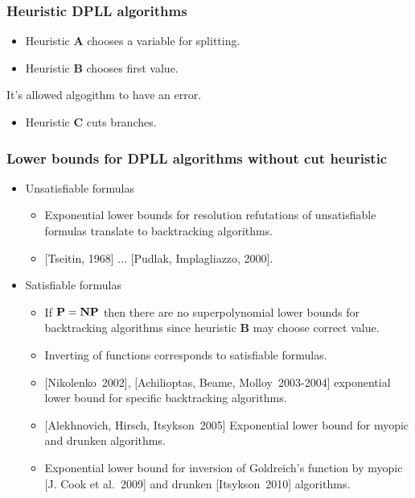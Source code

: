 \begin{frame}
	\frametitle{Heuristic DPLL algorithms}

   	
    
	\pause
    \pause
    \pause
    \pause
    \pause
    \begin{itemize}
        \item Heuristic $\mathbf{A}$ chooses a variable for splitting.
    	\pause
	    \item Heuristic $\mathbf{B}$ chooses first value.
    \end{itemize}

    \pause
    It's allowed algogithm to have an error.

    \pause
    \pause
    \begin{itemize}
	    \item Heuristic $\mathbf{C}$ cuts branches.
    \end{itemize}
\end{frame}

\begin{frame}
    \frametitle{Lower bounds for DPLL algorithms without cut heuristic}

    \pause
	\begin{itemize}
		\item Unsatisfiable formulas
		\begin{itemize}
            \item{} Exponential lower bounds for resolution refutations
				of unsatisfiable formulas translate to backtracking
                algorithms.
			\item{} [Tseitin, 1968] ... [Pudlak, Implagliazzo, 2000].
		\end{itemize}
        \pause
		\item Satisfiable formulas
		\begin{itemize}
			\item If $\bf P = NP$ then there are no superpolynomial
		        lower bounds for backtracking algorithms since
                heuristic $\mathbf{B}$ may choose correct value.
            \pause
			\item Inverting of functions corresponds to satisfiable
		        formulas.
            \pause
            \item{} [Nikolenko~2002], [Achilioptas, Beame, Molloy~2003-2004]
				exponential lower bound for specific backtracking
                algorithms.
            \item{} [Alekhnovich, Hirsch, Itsykson~2005] Exponential lower bound 
				for myopic and drunken algorithms.
            \pause
            \item{}  Exponential lower bound 
		for inversion of Goldreich's function by myopic [J. Cook et al.~2009] 
		and drunken [Itsykson~2010] algorithms.
		\end{itemize}
	\end{itemize}
\end{frame}


